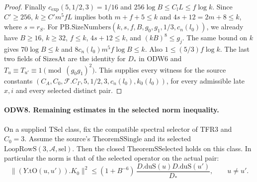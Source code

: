 \begin{proof}
Finally $c_{\exp}(5,1/2,3)=1/16$ and
$256\log B\le C_l L\le f\log k$. Since $C'\ge256$,
$k\ge C'm^5 fL$ implies both $m+f+5\le k$ and
$4s+12=2m+8\le k$, where $s=r_S$. For
$\mathrm{PB.SizeNumbers}(k,s,f,B,g_0,g_1,1/3,c_n(l_0))$,
we already have $B\ge16$, $k\ge32$, $f\le k$, $4s+12\le k$,
and $(kB)^8\le g_j$. The same bound on $k$ gives
$70\log B\le k$ and $8c_n(l_0)m^5f\log B\le k$.
Also $1\le(5/3)f\log k$. The last two fields of
$\mathrm{SizesAt}$ are the identity for $D_*$ in ODW6 and
$T_u\equiv T_{u'}\equiv1\pmod{(g_0g_1)^2}$.
This supplies every witness for the source constants
$(C_A,C_0,\mathcal F.C_\Gamma,5,1/2,3,c_n(l_0),k_0(l_0))$,
for every admissible late $x,i$ and every selected distinct pair.
\end{proof}

\paragraph{ODW8. Remaining estimates in the selected norm inequality.}
\label{claim:ODW8}
On a supplied $\mathrm{TSel}$ class, fix the compatible spectral
selector of TFR3 and $C_0=3$. Assume the source's
$\mathrm{TheoremSSingle}$ and its selected
$\mathrm{LoopRowS}(3,\mathcal A,\mathrm{sel})$. Then the closed
$\mathrm{TheoremSSelected}$ holds on this class. In particular
the norm is that of the selected operator on the actual pair:
\[
 \|(Y.\mathrm{tO}(u,u')).K_0\|^2
  \le (1+B^{-6})\,
         \frac{D.\mathrm{duS}(u)D.\mathrm{duS}(u')}{D_*},
              \qquad u\ne u'.
\]
